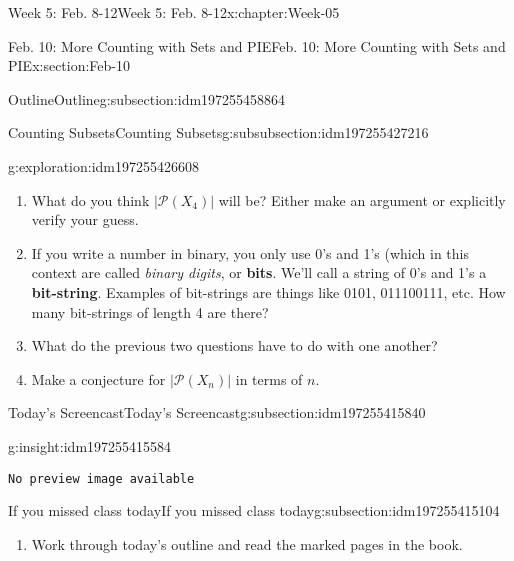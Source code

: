 \documentclass[oneside,10pt,]{book}
\newcommand{\mono}[1]{\texttt{#1}}
\newcommand{\terminology}[1]{\textbf{#1}}
\numberwithin{equation}{section}
\newlength{\qrsize}
\newlength{\previewwidth}
\def\pow{{\mathcal P}}
\newcommand{\pow}{\mathcal P}
\newcommand{\card}[1]{\left| #1 \right|}
\begin{document}
\begin{chapterptx}{Week 5: Feb. 8-12}{}{Week 5: Feb. 8-12}{}{}{x:chapter:Week-05}
\begin{sectionptx}{Feb. 10: More Counting with Sets and PIE}{}{Feb. 10: More Counting with Sets and PIE}{}{}{x:section:Feb-10}
\begin{subsectionptx}{Outline}{}{Outline}{}{}{g:subsection:idm197255458864}
\begin{subsubsectionptx}{Counting Subsets}{}{Counting Subsets}{}{}{g:subsubsection:idm197255427216}
\begin{exploration}{}{g:exploration:idm197255426608}
\begin{enumerate}
\item{}What do you think \(\card{\pow(X_4)}\) will be? Either make an argument or explicitly verify your guess.%
\item{}If you write a number in binary, you only use 0's and 1's (which in this context are called \emph{binary digits}, or \terminology{bits}. We'll call a string of 0's and 1's a \terminology{bit-string}. Examples of bit-strings are things like 0101, 011100111, etc. How many bit-strings of length 4 are there?%
\item{}What do the previous two questions have to do with one another?%
\item{}Make a conjecture for \(\card{\pow(X_n)}\) in terms of \(n\).%
\end{enumerate}
\end{exploration}%
\end{subsubsectionptx}
\end{subsectionptx}
%
%
\typeout{************************************************}
\typeout{************************************************}
%
\begin{subsectionptx}{Today's Screencast}{}{Today's Screencast}{}{}{g:subsection:idm197255415840}
\begin{insight}{}{g:insight:idm197255415584}%
\setlength{\qrsize}{9em}
\setlength{\previewwidth}{\linewidth}
\addtolength{\previewwidth}{-\qrsize}
\begin{tcbraster}[raster columns=2, raster column skip=1pt, raster halign=center, raster force size=false, raster left skip=0pt, raster right skip=0pt]%
\begin{tcolorbox}[previewstyle, width=\previewwidth]%
\mono{No preview image available}%
\end{tcolorbox}%
\begin{tcolorbox}[qrstyle]%
[QR LINK]\end{tcolorbox}%
\end{tcbraster}%
\end{insight}
\end{subsectionptx}
%
%
\typeout{************************************************}
\typeout{************************************************}
%
\begin{subsectionptx}{If you missed class today}{}{If you missed class today}{}{}{g:subsection:idm197255415104}
%
\begin{enumerate}
\item{}Work through today's outline and read the marked pages in the book.%

\end{enumerate}
\end{subsectionptx}
\end{sectionptx}
\end{chapterptx}
\end{document}

